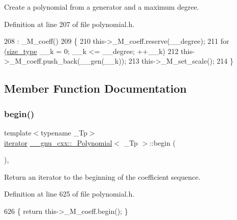 Create a polynomial from a generator and a maximum degree. 

Definition at line 207 of file polynomial.\+h.


\begin{DoxyCode}
208         : \_M\_coeff()
209         \{
210           this->\_M\_coeff.reserve(\_\_degree);
211           \textcolor{keywordflow}{for} (\hyperlink{class____gnu__cxx_1_1__Polynomial_a6afe219c123c7a2fdc5abac8a6639053}{size\_type} \_\_k = 0; \_\_k <= \_\_degree; ++\_\_k)
212             this->\_M\_coeff.push\_back(\_\_gen(\_\_k));
213           this->\_M\_set\_scale();
214         \}
\end{DoxyCode}


\subsection{Member Function Documentation}
\mbox{\label{class____gnu__cxx_1_1__Polynomial_a2f9cf484724c2aef472975fc3d8bd99d}} 
\subsubsection{\texorpdfstring{begin()}{begin()}\hspace{0.1cm}{\footnotesize\ttfamily [1/2]}}
{\footnotesize\ttfamily template$<$typename \+\_\+\+Tp$>$ \\
\hyperlink{class____gnu__cxx_1_1__Polynomial_a64bd557b6af46992e352dbe9e30fa201}{iterator} \hyperlink{class____gnu__cxx_1_1__Polynomial}{\+\_\+\+\_\+gnu\+\_\+cxx\+::\+\_\+\+Polynomial}$<$ \+\_\+\+Tp $>$\+::begin (\begin{DoxyParamCaption}{ }\end{DoxyParamCaption})\hspace{0.3cm}{\ttfamily [inline]}, {\ttfamily [noexcept]}}

Return an iterator to the beginning of the coefficient sequence. 

Definition at line 625 of file polynomial.\+h.


\begin{DoxyCode}
626       \{ \textcolor{keywordflow}{return} this->\_M\_coeff.begin(); \}
\end{DoxyCode}
\mbox{\label{class____gnu__cxx_1_1__Polynomial_a57902287656245f5ae1ee7406b419c9b}} 
